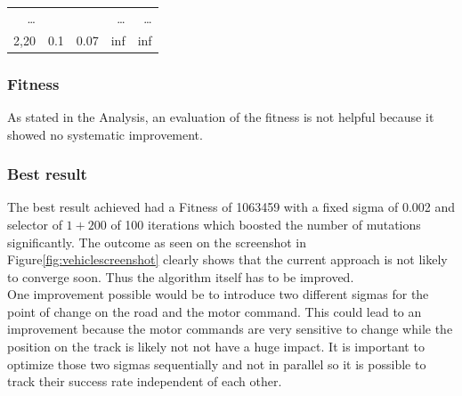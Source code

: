 \documentclass{scrartcl}
\begin{document}
\begin{table}[H]
\begin{tabular}{r r r|r r }
\dots & & & \dots & \dots \\
2,20 & 0.1 & 0.07 & inf & inf \\ 
\end{tabular}
\label{tab:vehicle}
\end{table}


\subsubsection{Fitness}
As stated in the Analysis, an evaluation of the fitness is not helpful because it showed no systematic improvement.

\subsubsection{Best result}
The best result achieved had a Fitness of 1063459 with a fixed sigma of 0.002 and selector of $1+200$ of 100 iterations which boosted the number of mutations significantly. The outcome as seen on the screenshot in Figure\ref{fig:vehiclescreenshot} clearly shows that the current approach is not likely to converge soon. Thus the algorithm itself has to be improved.\\
One improvement possible would be to introduce two different sigmas for the point of change on the road and the motor command. This could lead to an improvement because the motor commands are very sensitive to change while the position on the track is likely not not have a huge impact. It is important to optimize those two sigmas sequentially and not in parallel so it is possible to track their success rate independent of each other.
\end{document}
